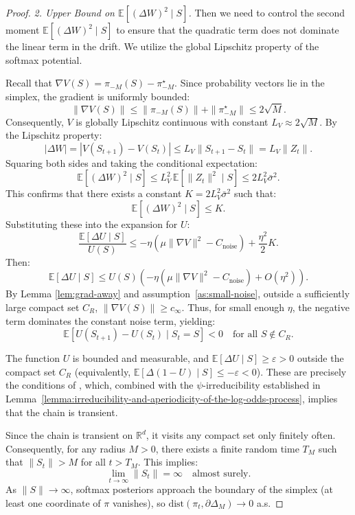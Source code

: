 \documentclass[12pt]{article}
\begin{document}
\begin{proof}
\textit{2. Upper Bound on $\mathbb{E}[(\Delta W)^2 \mid S]$.}
Then we need to control the second moment $\mathbb{E}[(\Delta W)^2 \mid S]$ to ensure that the quadratic term does not dominate the linear term in the drift. We utilize the global Lipschitz property of the softmax potential.
    
Recall that $\nabla V(S) = \pi_{-M}(S) - \pi^\star_{-M}$. Since probability vectors lie in the simplex, the gradient is uniformly bounded:
\[
\|\nabla V(S)\| \le \|\pi_{-M}(S)\| + \|\pi^\star_{-M}\| \le 2\sqrt{M}.
\]
Consequently, $V$ is globally Lipschitz continuous with constant $L_V \approx 2\sqrt{M}$. By the Lipschitz property:
\[
|\Delta W| = |V(S_{t+1}) - V(S_t)| \le L_V \|S_{t+1} - S_t\| = L_V \|Z_t\|.
\]
Squaring both sides and taking the conditional expectation:
\[
\mathbb{E}\left[(\Delta W)^2 \mid S\right] \le L_V^2 \, \mathbb{E}\left[\|Z_t\|^2 \mid S\right] \le 2 L_V^2 \bar{\sigma}^2.
\]
This confirms that there exists a constant $K = 2 L_V^2 \bar{\sigma}^2$ such that:
\[
\mathbb{E}[(\Delta W)^2 \mid S] \le K.
\]
Substituting these into the expansion for $U$:
\[
\frac{\mathbb{E}[\Delta U \mid S]}{U(S)} \le -\eta \left(\mu \|\nabla V\|^2 - C_{\text{noise}}\right) + \frac{\eta^2}{2} K.
\]
Then:
\[
\mathbb{E}[\Delta U \mid S] \le U(S) \left( -\eta \left(\mu \|\nabla V\|^2 - C_{\text{noise}}\right) + O(\eta^2) \right).
\]
By Lemma \ref{lem:grad-away} and assumption~\ref{as:small-noise}, outside a sufficiently large compact set $C_R$, $\|\nabla V(S)\| \ge c_\infty$. Thus, for small enough $\eta$, the negative term dominates the constant noise term, yielding:
\[
\mathbb{E}[U(S_{t+1}) - U(S_t) \mid S_t = S] < 0 \quad \text{for all } S \notin C_R.
\]

The function $U$ is bounded and measurable, and $\mathbb{E}[\Delta U \mid S] \geq \varepsilon > 0$ outside the compact set $C_R$ (equivalently, $\mathbb{E}[\Delta(1-U) \mid S] \leq -\varepsilon < 0$). These are precisely the conditions of \citet[Thm.~8.4.2]{meynMarkovChainsStochastic1993}, which, combined with the $\psi$-irreducibility established in Lemma~\ref{lemma:irreducibility-and-aperiodicity-of-the-log-odds-process}, implies that the chain is transient.

Since the chain is transient on $\mathbb{R}^d$, it visits any compact set only finitely often. Consequently, for any radius $M > 0$, there exists a finite random time $T_M$ such that $\|S_t\| > M$ for all $t > T_M$. This implies: 
\[
\lim_{t \to \infty} \|S_t\| = \infty \quad \text{almost surely.}
\]
As $\|S\|\to\infty$, softmax posteriors approach the boundary of the simplex (at least one coordinate of $\pi$ vanishes), so $\mathrm{dist}(\pi_t,\partial\Delta_M)\to 0$ a.s.

\end{proof}
\end{document}
